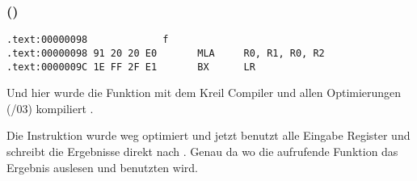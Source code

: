 ﻿\subsubsection{\OptimizingKeilVI (\ARMMode)}

\begin{lstlisting}[label=ARM_leaf_example1]
.text:00000098             f
.text:00000098 91 20 20 E0       MLA     R0, R1, R0, R2
.text:0000009C 1E FF 2F E1       BX      LR
\end{lstlisting}


Und hier wurde die \ttf Funktion mit dem Kreil Compiler und allen Optimierungen (/03) kompiliert .

Die \MOV Instruktion wurde weg optimiert und jetzt benutzt  alle Eingabe 
Register und schreibt die Ergebnisse direkt nach . Genau da wo die 
aufrufende Funktion das Ergebnis auslesen und benutzten wird.


